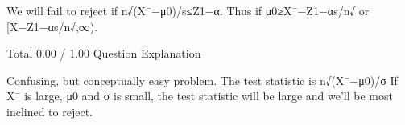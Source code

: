 We will fail to reject if n√(X¯−μ0)/s≤Z1−α. Thus if μ0≥X¯−Z1−αs/n√ or [X−Z1−αs/n√,∞).

Total		0.00 / 1.00	
Question Explanation

Confusing, but conceptually easy problem. The test statistic is n√(X¯−μ0)/σ If X¯ is large, μ0 and σ is small, the test statistic will be large and we'll be most inclined to reject.
